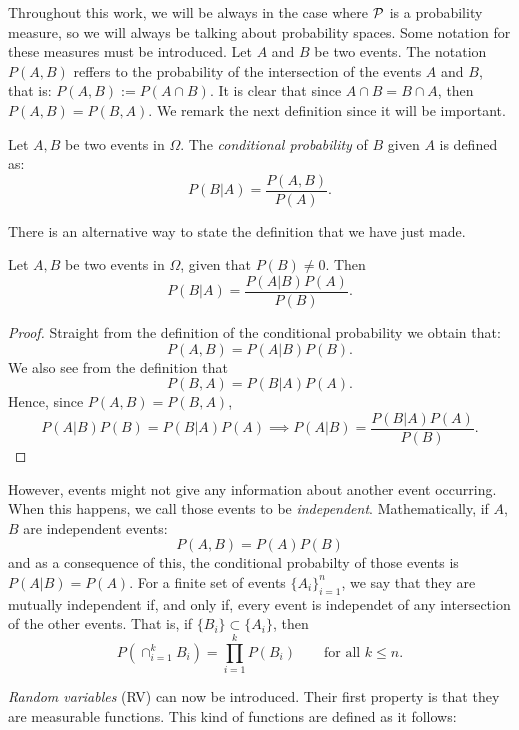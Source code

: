 Throughout this work, we will be always in the case where $\mathcal{P}$ is a probability measure, so we will always be talking about probability spaces. Some notation for these measures must be introduced. Let $A$ and $B$ be two events.
The notation $P(A,B)$ reffers to the probability of the intersection of the events $A$ and $B$, that is: $P(A,B) := P(A\cap B)$.
 It is clear that since $A \cap B = B \cap A$, then $P(A,B) = P(B,A)$. We remark the next definition since it will be important.

\begin{ndef}
Let $A,B$ be two events in $\Omega$. The \emph{conditional probability} of $B$ given $A$ is defined as:
$$
P(B|A) = \frac{P(A,B)}{P(A)}.
$$
\end{ndef}




There is an alternative way to state the definition that we have just made.

\begin{nth}
Let $A,B$ be two events in $\Omega$, given that $P(B) \neq 0$. Then
$$
P(B|A) = \frac{P(A|B) P(A)}{P(B)}.
$$
\end{nth}
\begin{proof}
Straight from the definition of the conditional probability we obtain that:
$$
P(A,B) = P(A|B)P(B).
$$
We also see from the definition that
$$
P(B,A) = P(B|A)P(A).
$$
Hence, since $P(A,B) = P(B,A)$,
$$
P(A|B)P(B) = P(B|A)P(A) \implies P(A|B) = \frac{P(B|A)P(A)}{P(B)}.
$$
\end{proof}


However, events might not give any information about another event occurring. When this happens, we call those events to be \emph{independent}. Mathematically, if $A$,$B$ are independent events:
$$
P(A,B) = P(A)P(B)
$$
and as a consequence of this, the conditional probabilty of those events is $P(A|B) = P(A)$. For a finite set of events $\{A_i\}_{i=1}^n$, we say that they are mutually independent if, and only if, every event is independet of any intersection of the other events. 
That is, if $\{B_i\} \subset \{A_i\}$, then
$$
P\left(\cap_{i = 1}^k B_i \right) = \prod_{i = 1}^k P(B_i) \quad \quad \text{for all } k \leq n.
$$

\emph{Random variables} (RV) can now be introduced. Their first property is that they are measurable functions. This kind of functions are defined as it follows:

